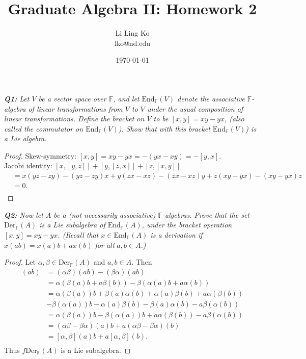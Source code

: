 \documentclass{article}
\begin{document}
\title{Graduate Algebra II: Homework 2}
\author{Li Ling Ko\\ lko@nd.edu}
\date{\today}
\maketitle

\it \textbf{Q1:} Let $V$ be a vector space over $\mathbb{F}$, and let
  $\text{End}_{\mathbb{F}}(V)$ denote the associative $\mathbb{F}$-algebra
  of linear transformations from $V$ to $V$ under the usual composition of
  linear transformations. Define the bracket on $V$ to be $[x,y]=xy-yx$,
  (also called the commutator on $\text{End}_{\mathbb{F}}(V)$). Show that
  with this bracket $\text{End}_{\mathbb{F}}(V)$) is a Lie algebra.

  \begin{proof}
    Skew-symmetry: $[x,y]=xy-yx=-(yx-xy)=-[y,x]$. \\
    Jacobi identity: $[x,[y,z]]+[y,[z,x]]+[z,[x,y]]$
    \begin{align*}
      &=x(yz-zy)-(yz-zy)x +y(zx-xz)-(zx-xz)y +z(xy-yx)-(xy-yx)z\\
      &=0.\\
    \end{align*}
  \end{proof}

\it \textbf{Q2:} Now let $A$ be a (not necessarily associative)
  $\mathbb{F}$-algebras. Prove that the set $\text{Der}_{\mathbb{F}}(A)$ is
  a Lie subalgebra of $\text{End}_{\mathbb{F}}(A)$, under the bracket
  operation $[x,y]=xy-yx$. (Recall that $x\in\text{End}_{\mathbb{F}}(A)$ is
  a derivation if $x(ab)=x(a)b+ax(b)$ for all $a,b\in A$.)

  \begin{proof}
    Let $\alpha,\beta\in\text{Der}_{\mathbb{F}}(A)$ and $a,b\in A$. Then
    \begin{align*}
      [\alpha,\beta](ab) &=(\alpha\beta)(ab) -(\beta\alpha)(ab)\\
      &=\alpha(\beta(a)b+a\beta(b)) -\beta(\alpha(a)b+a\alpha(b))\\
      &=\alpha(\beta(a))b +\beta(a)\alpha(b) +\alpha(a)\beta(b)
        +a\alpha(\beta(b))\\
      &-\beta(\alpha(a))b -\alpha(a)\beta(b) -\beta(a)\alpha(b)
        -a\beta(\alpha(b))\\
      &=\alpha(\beta(a))b -\beta(\alpha(a))b + a\alpha(\beta(b))
        -a\beta(\alpha(b))\\
      &=(\alpha\beta-\beta\alpha)(a)b + a(\alpha\beta-\beta\alpha)(b)\\
      &=[\alpha,\beta](a)b + a[\alpha,\beta](b).\\
    \end{align*}
    Thus $f\text{Der}_{\mathbb{F}}(A)$ is a Lie subalgebra.
  \end{proof}
\end{document}
